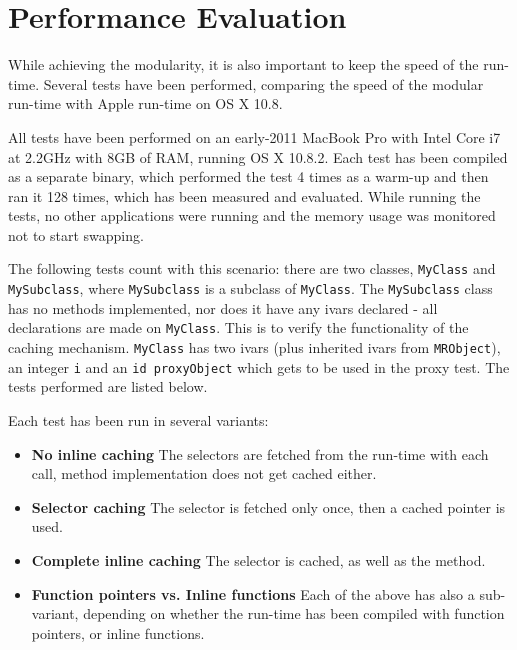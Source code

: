 \chapter{Performance Evaluation}

While achieving the modularity, it is also important to keep the speed of the run-time. Several tests have been performed, comparing the speed of the modular run-time with Apple run-time on OS X 10.8.

All tests have been performed on an early-2011 MacBook Pro with Intel Core i7 at 2.2GHz with 8GB of RAM, running OS X 10.8.2. Each test has been compiled as a separate binary, which performed the test 4 times as a warm-up and then ran it 128 times, which has been measured and evaluated. While running the tests, no other applications were running and the memory usage was monitored not to start swapping.

The following tests count with this scenario: there are two classes, \verb=MyClass= and \verb=MySubclass=, where \verb=MySubclass= is a subclass of \verb=MyClass=. The \verb=MySubclass= class has no methods implemented, nor does it have any ivars declared - all declarations are made on \verb=MyClass=. This is to verify the functionality of the caching mechanism. \verb=MyClass= has two ivars (plus inherited ivars from \verb=MRObject=), an integer \verb=i= and an \verb=id proxyObject= which gets to be used in the proxy test. The tests performed are listed below.

Each test has been run in several variants:

\begin{itemize}
	\item{\bf{No inline caching}} The selectors are fetched from the run-time with each call, method implementation does not get cached either.
	\item{\bf{Selector caching}} The selector is fetched only once, then a cached pointer is used.
	\item{\bf{Complete inline caching}} The selector is cached, as well as the method.
	\item{\bf{Function pointers vs. Inline functions}} Each of the above has also a sub-variant, depending on whether the run-time has been compiled with function pointers, or inline functions.
\end{itemize}

